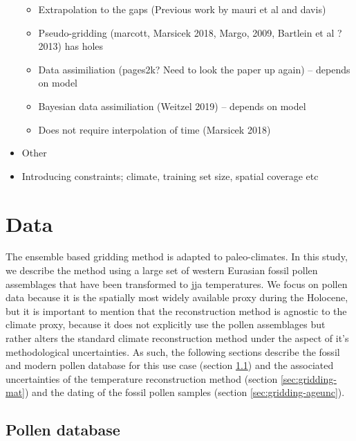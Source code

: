 \begin{refsection}
\begin{itemize}
\begin{itemize}
		\item Extrapolation to the gaps (Previous work by mauri et al and davis)
		\item Pseudo-gridding (marcott, Marsicek 2018, Margo, 2009, Bartlein et al ?2013) has holes
		\item Data assimiliation (pages2k? Need to look the paper up again) – depends on model
		\item Bayesian data assimiliation (Weitzel 2019) – depends on model
		\item Does not require interpolation of time (Marsicek 2018)
	\end{itemize}
	\item Other
	\item Introducing constraints; climate, training set size, spatial coverage etc
\end{itemize}

\section{Data}  \label{sec:gridding-data}

The ensemble based gridding method is adapted to paleo-climates. In this study, we describe the method using a large set of western Eurasian fossil pollen assemblages that have been transformed to \gls{jja} temperatures. We focus on pollen data because it is the spatially most widely available proxy during the Holocene, but it is important to mention that the reconstruction method is agnostic to the climate proxy, because it does not explicitly use the pollen assemblages but rather alters the standard climate reconstruction method under the aspect of it's methodological uncertainties. As such, the following sections describe the fossil and modern pollen database for this use case (section \ref{sec:gridding-polnet}) and the associated uncertainties of the temperature reconstruction method (section \ref{sec:gridding-mat}) and the dating of the fossil pollen samples (section \ref{sec:gridding-ageunc}).

\subsection{Pollen database}  \label{sec:gridding-polnet}


\end{refsection}
